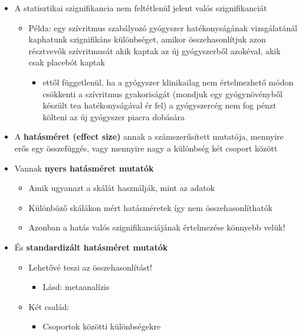 \documentclass[
  letterpaper,
  DIV=11,
  numbers=noendperiod]{scrreprt}
\providecommand{\tightlist}{%
  \setlength{\itemsep}{0pt}\setlength{\parskip}{0pt}}\usepackage{longtable,booktabs,array}
\begin{document}
\begin{itemize}
\item
  A statisztikai szignifikancia nem feltétlenül jelent valós
  szignifikanciát

  \begin{itemize}
  \item
    Példa: egy szívritmus szabályozó gyógyszer hatékonyságának
    vizsgálatánál kaphatunk szignifikáns különbséget, amikor
    összehasonlítjuk azon résztvevők szívritmusát akik kaptak az új
    gyógyszerből azokéval, akik csak placebót kaptak

    \begin{itemize}
    \tightlist
    \item
      ettől függetlenül, ha a gyógyszer klinikailag nem értelmezhető
      módon csökkenti a szívritmus gyakoriságát (mondjuk egy
      gyógynövényből készült tea hatékonyságával ér fel) a gyógyszercég
      nem fog pénzt költeni az új gyógyszer piacra dobására
    \end{itemize}
  \end{itemize}
\item
  A \textbf{hatásméret (effect size)} annak a számszerűsített mutatója,
  mennyire erős egy összefüggés, vagy mennyire nagy a különbség két
  csoport között
\item
  Vannak \textbf{nyers hatásméret mutatók}

  \begin{itemize}
  \item
    Amik ugyanazt a skálát használják, mint az adatok
  \item
    Különböző skálákon mért hatásméretek így nem összehasonlíthatók
  \item
    Azonban a hatás valós szignifikanciájának értelmezése könnyebb
    velük!
  \end{itemize}
\item
  És \textbf{standardizált hatásméret mutatók}

  \begin{itemize}
  \item
    Lehetővé teszi az összehasonlítást!

    \begin{itemize}
    \tightlist
    \item
      Lásd: metaanalízis
    \end{itemize}
  \item
    Két család:

    \begin{itemize}
    \item
      Csoportok közötti különbségekre


\end{itemize}
\end{itemize}
\end{itemize}
\end{document}

